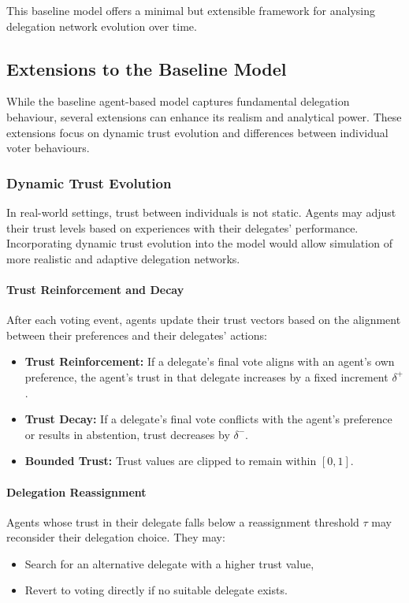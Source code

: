 This baseline model offers a minimal but extensible framework for analysing delegation network evolution over time.

\subsection{Extensions to the Baseline Model}

While the baseline agent-based model captures fundamental delegation behaviour, several extensions can enhance its realism and analytical power. These extensions focus on dynamic trust evolution and differences between individual voter behaviours.

\subsubsection{Dynamic Trust Evolution}

In real-world settings, trust between individuals is not static. Agents may adjust their trust levels based on experiences with their delegates' performance. Incorporating dynamic trust evolution into the model would allow simulation of more realistic and adaptive delegation networks.

\paragraph{Trust Reinforcement and Decay}

After each voting event, agents update their trust vectors based on the alignment between their preferences and their delegates' actions:
\begin{itemize}
    \item \textbf{Trust Reinforcement:} If a delegate's final vote aligns with an agent's own preference, the agent's trust in that delegate increases by a fixed increment $\delta^+$.
    \item \textbf{Trust Decay:} If a delegate's final vote conflicts with the agent's preference or results in abstention, trust decreases by $\delta^-$.
    \item \textbf{Bounded Trust:} Trust values are clipped to remain within $[0,1]$.
\end{itemize}

\paragraph{Delegation Reassignment}

Agents whose trust in their delegate falls below a reassignment threshold $\tau$ may reconsider their delegation choice. They may:
\begin{itemize}
    \item Search for an alternative delegate with a higher trust value,
    \item Revert to voting directly if no suitable delegate exists.
\end{itemize}


